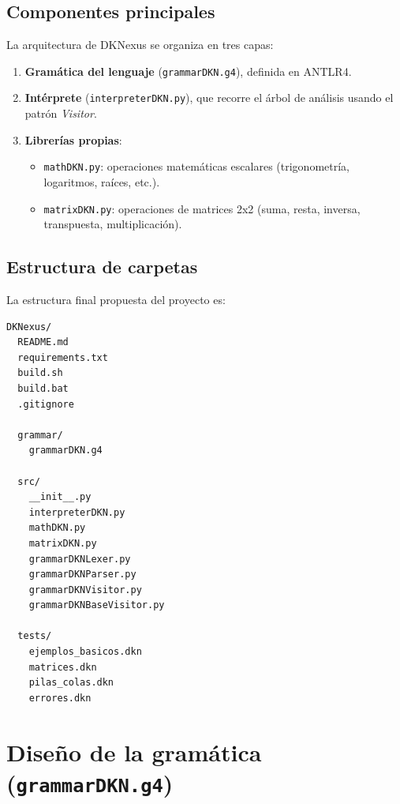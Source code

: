 \documentclass[stu, 12pt, letterpaper, donotrepeattitle, floatsintext, natbib]{apa7}
\begin{document}
\subsection{Componentes principales}
La arquitectura de DKNexus se organiza en tres capas:
\begin{enumerate}
  \item \textbf{Gramática del lenguaje} (\texttt{grammarDKN.g4}), definida en ANTLR4.
  \item \textbf{Intérprete} (\texttt{interpreterDKN.py}), que recorre el árbol de análisis usando el patrón \textit{Visitor}.
  \item \textbf{Librerías propias}:
  \begin{itemize}
    \item \texttt{mathDKN.py}: operaciones matemáticas escalares (trigonometría, logaritmos, raíces, etc.).
    \item \texttt{matrixDKN.py}: operaciones de matrices 2x2 (suma, resta, inversa, transpuesta, multiplicación).
  \end{itemize}
\end{enumerate}

\subsection{Estructura de carpetas}
La estructura final propuesta del proyecto es:
\begin{verbatim}
DKNexus/
  README.md
  requirements.txt
  build.sh
  build.bat
  .gitignore

  grammar/
    grammarDKN.g4

  src/
    __init__.py
    interpreterDKN.py
    mathDKN.py
    matrixDKN.py
    grammarDKNLexer.py
    grammarDKNParser.py
    grammarDKNVisitor.py
    grammarDKNBaseVisitor.py

  tests/
    ejemplos_basicos.dkn
    matrices.dkn
    pilas_colas.dkn
    errores.dkn
\end{verbatim}

\section{\large Diseño de la gramática (\texttt{grammarDKN.g4})}
\end{document}
